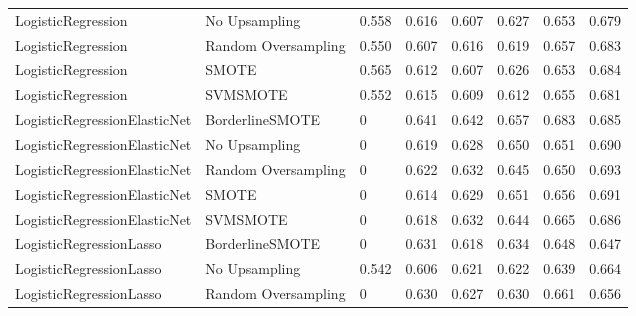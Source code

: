 \begin{tabular}{llllllll}
          LogisticRegression &       No Upsampling & 0.558 &                     0.616 &                 0.607 &                  0.627 &                                   0.653 &     0.679 \\
          LogisticRegression & Random Oversampling & 0.550 &                     0.607 &                 0.616 &                  0.619 &                                   0.657 &     0.683 \\
          LogisticRegression &               SMOTE & 0.565 &                     0.612 &                 0.607 &                  0.626 &                                   0.653 &     0.684 \\
          LogisticRegression &            SVMSMOTE & 0.552 &                     0.615 &                 0.609 &                  0.612 &                                   0.655 &     0.681 \\
LogisticRegressionElasticNet &     BorderlineSMOTE &     0 &                     0.641 &                 0.642 &                  0.657 &                                   0.683 &     0.685 \\
LogisticRegressionElasticNet &       No Upsampling &     0 &                     0.619 &                 0.628 &                  0.650 &                                   0.651 &     0.690 \\
LogisticRegressionElasticNet & Random Oversampling &     0 &                     0.622 &                 0.632 &                  0.645 &                                   0.650 &     0.693 \\
LogisticRegressionElasticNet &               SMOTE &     0 &                     0.614 &                 0.629 &                  0.651 &                                   0.656 &     0.691 \\
LogisticRegressionElasticNet &            SVMSMOTE &     0 &                     0.618 &                 0.632 &                  0.644 &                                   0.665 &     0.686 \\
     LogisticRegressionLasso &     BorderlineSMOTE &     0 &                     0.631 &                 0.618 &                  0.634 &                                   0.648 &     0.647 \\
     LogisticRegressionLasso &       No Upsampling & 0.542 &                     0.606 &                 0.621 &                  0.622 &                                   0.639 &     0.664 \\
     LogisticRegressionLasso & Random Oversampling &     0 &                     0.630 &                 0.627 &                  0.630 &                                   0.661 &     0.656 \\

\end{tabular}
